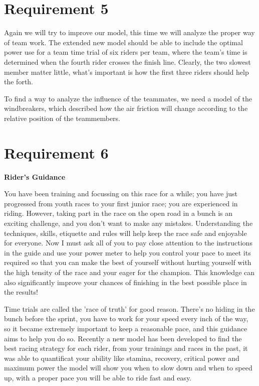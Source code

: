 \documentclass[12pt]{article}
\begin{document}
\section{Requirement 5}
Again we will try to improve our model, this time we will analyze the proper way of team work. The extended new model should be able to  include the optimal power use for a team time trial of six riders per team, where the team's time is
determined when the fourth rider crosses the finish line. Clearly, the two slowest member matter little, what's important is how the first three riders should help the forth.

To find a way to analyze the influence of the teammates, we need a model of the windbreakers, which described how the air friction will change according to the relative
position of the teammembers.
\newpage
\section{Requirement 6}
\begin{center}
    \huge \textbf{Rider's Guidance}
\end{center}\large
You have been training and focussing on this race for a while; you  have just progressed from youth races to your first junior race; you are experienced in riding.
However, taking part in the race on the open road in a bunch is an exciting challenge, and you don't want to make any mistakes.
Understanding the techniques, skills, etiquette and rules will help keep the race safe and enjoyable for everyone. Now I must ask all of you to pay close attention to the instructions in the guide and use your power meter
to help you control your pace to meet its required so that you can make the best of yourself without hurting yourself with the high tensity of the race and your eager for
the champion. This knowledge can also significantly improve your chances of finishing in the best possible place in the results!

Time trials are called the 'race of truth' for good reason. There's no hiding in the bunch before the sprint, you have to work for your speed every inch of the way, so it
became extremely  important to keep a reasonable pace, and this guidance aims to help you do so.
Recently a new model has been developed to find the best racing strategy for each rider, from your trainings and races in the past, it was able to quantificat your ability
like stamina, recovery, critical power and maximum power the model will show you when to slow down and when to speed up, with a proper pace you will be able to ride
fast and easy.
\end{document}
